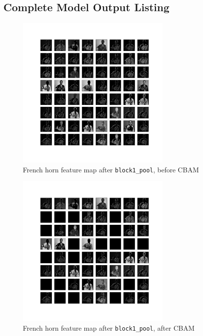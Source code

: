 \documentclass{article}
\begin{document}



\newpage
\begin{appendices}
\section{Complete Model Output Listing} \label{outputlist}

\begin{figure}[H]
    \centering
    \includegraphics[width=3in]{csci-8920/hw-4/images/horn-pre-CBAM-3-block1_pool.png}
    \caption{French horn feature map after \lstinline{block1_pool}, before CBAM}
    \label{fig:horn_2_pre}
\end{figure}

\begin{figure}[H]
    \centering
    \includegraphics[width=3in]{csci-8920/hw-4/images/horn-post-CBAM-3-block1_pool.png}
    \caption{French horn feature map after \lstinline{block1_pool}, after CBAM}
    \label{fig:horn_2_pre}
\end{figure}


\end{appendices}
\end{document}
